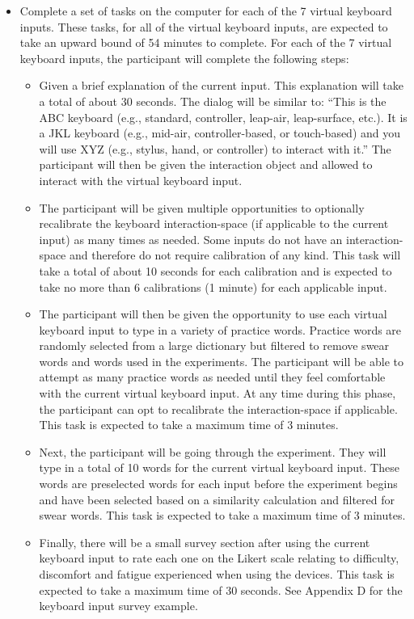 \begin{itemize}
\item Complete a set of tasks on the computer for each of the 7 virtual keyboard inputs. These tasks, for all of the virtual keyboard inputs, are expected to take an upward bound of 54 minutes to complete. For each of the 7 virtual keyboard inputs, the participant will complete the following steps:
\begin{itemize}
\item Given a brief explanation of the current input. This explanation will take a total of about 30 seconds. The dialog will be similar to: “This is the ABC keyboard (e.g., standard, controller, leap-air, leap-surface, etc.). It is a JKL keyboard (e.g., mid-air, controller-based, or touch-based) and you will use XYZ (e.g., stylus, hand, or controller) to interact with it.” The participant will then be given the interaction object and allowed to interact with the virtual keyboard input.
\item The participant will be given multiple opportunities to optionally recalibrate the keyboard interaction-space (if applicable to the current input) as many times as needed. Some inputs do not have an interaction-space and therefore do not require calibration of any kind. This task will take a total of about 10 seconds for each calibration and is expected to take no more than 6 calibrations (1 minute) for each applicable input.
\item The participant will then be given the opportunity to use each virtual keyboard input to type in a variety of practice words. Practice words are randomly selected from a large dictionary but filtered to remove swear words and words used in the experiments. The participant will be able to attempt as many practice words as needed until they feel comfortable with the current virtual keyboard input. At any time during this phase, the participant can opt to recalibrate the interaction-space if applicable. This task is expected to take a maximum time of 3 minutes.
\item Next, the participant will be going through the experiment. They will type in a total of 10 words for the current virtual keyboard input. These words are preselected words for each input before the experiment begins and have been selected based on a similarity calculation and filtered for swear words. This task is expected to take a maximum time of 3 minutes.
\item Finally, there will be a small survey section after using the current keyboard input to rate each one on the Likert scale relating to difficulty, discomfort and fatigue experienced when using the devices. This task is expected to take a maximum time of 30 seconds. See Appendix D for the keyboard input survey example.

\end{itemize}
\end{itemize}
